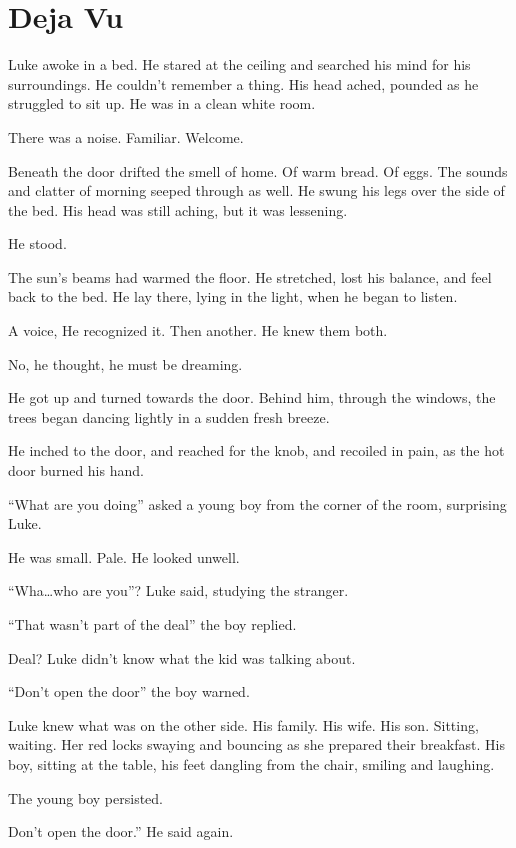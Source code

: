 \chapter{Deja Vu}



Luke awoke in a bed. He stared at the ceiling and searched his mind
for his surroundings. He couldn't remember a thing. His head
ached, pounded as he struggled to sit up. He was in a clean white
room.

There was a noise. Familiar. Welcome.

Beneath the door drifted the smell of home. Of warm bread. Of eggs.
The sounds and clatter of morning seeped through as well. He swung
his legs over the side of the bed. His head was still aching, but
it was lessening.

He stood.

The sun's beams had warmed the floor. He stretched, lost his
balance, and feel back to the bed. He lay there, lying in the
light, when he began to listen.

A voice, He recognized it. Then another. He knew them both.

No, he thought, he must be dreaming.

He got up and turned towards the door. Behind him, through the
windows, the trees began dancing lightly in a sudden fresh
breeze.

He inched to the door, and reached for the knob, and recoiled in
pain, as the hot door burned his hand.

``What are you doing'' asked a young boy from the corner
of the room, surprising Luke.

He was small. Pale. He looked unwell.

``Wha{\ldots}who are you''? Luke said, studying the
stranger.

``That wasn't part of the deal'' the boy
replied.

Deal? Luke didn't know what the kid was talking about.

``Don't open the door'' the boy warned.

Luke knew what was on the other side. His family. His wife. His
son. Sitting, waiting. Her red locks swaying and bouncing as she
prepared their breakfast. His boy, sitting at the table, his feet
dangling from the chair, smiling and laughing.

The young boy persisted.

Don't open the door.'' He said again.

